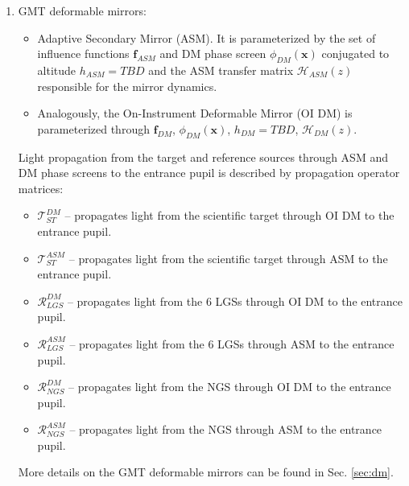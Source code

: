 \begin{enumerate}
	\item GMT deformable mirrors:
	\begin{itemize}
		\item Adaptive Secondary Mirror (ASM). It is parameterized by the set of
		influence functions $\bm{f}_{ASM}$ and DM phase screen
		$\phi_{DM}(\bm{x})$ conjugated to altitude $h_{ASM} = TBD$ and the
		ASM transfer matrix
		$\mathcal{H}_{ASM}(z)$ responsible for the mirror dynamics.
		\item Analogously, the On-Instrument Deformable Mirror (OI DM) is
		parameterized through $\bm{f}_{DM}$,
		$\phi_{DM}(\bm{x})$, $h_{DM} = TBD$, $\mathcal{H}_{DM}(z)$.
	\end{itemize}
	Light propagation from the target and reference sources through ASM and
	DM phase screens to the entrance pupil is described by propagation operator
	matrices:
	\begin{itemize}
		\item $\mathcal{T}_{ST}^{DM}$ -- propagates light from the scientific
		target through OI DM to the entrance pupil.
		\item $\mathcal{T}_{ST}^{ASM}$ -- propagates light from the scientific
		target through ASM to the entrance pupil.
		\item $\mathcal{R}_{LGS}^{DM}$ -- propagates light from the 6 LGSs
		through OI DM to the entrance pupil.
		\item $\mathcal{R}_{LGS}^{ASM}$ -- propagates light from the 6 LGSs
		through ASM to the entrance pupil.
		\item $\mathcal{R}_{NGS}^{DM}$ -- propagates light from the NGS
		through OI DM to the entrance pupil.
		\item $\mathcal{R}_{NGS}^{ASM}$ -- propagates light from the NGS
		through ASM to the entrance pupil.
	\end{itemize}
  More details on the GMT deformable mirrors can be found in Sec. \ref{sec:dm}.


\end{enumerate}
